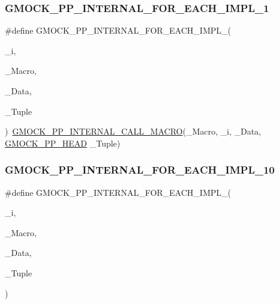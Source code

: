 \subsubsection{\texorpdfstring{GMOCK\_PP\_INTERNAL\_FOR\_EACH\_IMPL\_1}{GMOCK\_PP\_INTERNAL\_FOR\_EACH\_IMPL\_1}}
{\footnotesize\ttfamily \#define G\+M\+O\+C\+K\+\_\+\+P\+P\+\_\+\+I\+N\+T\+E\+R\+N\+A\+L\+\_\+\+F\+O\+R\+\_\+\+E\+A\+C\+H\+\_\+\+I\+M\+P\+L\+\_(\begin{DoxyParamCaption}\item[{}]{\+\_\+i,  }\item[{}]{\+\_\+\+Macro,  }\item[{}]{\+\_\+\+Data,  }\item[{}]{\+\_\+\+Tuple }\end{DoxyParamCaption})~\mbox{\hyperlink{_obj__test_2lib_2googletest-master_2googlemock_2include_2gmock_2internal_2gmock-pp_8h_a3fe0cf255d103cc945cd91e0e953846f}{G\+M\+O\+C\+K\+\_\+\+P\+P\+\_\+\+I\+N\+T\+E\+R\+N\+A\+L\+\_\+\+C\+A\+L\+L\+\_\+\+M\+A\+C\+RO}}(\+\_\+\+Macro, \+\_\+i, \+\_\+\+Data, \mbox{\hyperlink{_obj__test_2lib_2googletest-master_2googlemock_2include_2gmock_2internal_2gmock-pp_8h_ad7910160dfc0fb20b239efcf1f3ddd85}{G\+M\+O\+C\+K\+\_\+\+P\+P\+\_\+\+H\+E\+AD}} \+\_\+\+Tuple)}

\mbox{\label{_obj__test_2lib_2googletest-master_2googlemock_2include_2gmock_2internal_2gmock-pp_8h_ae6a832612f7db9940c60e2551343f697}} 
\subsubsection{\texorpdfstring{GMOCK\_PP\_INTERNAL\_FOR\_EACH\_IMPL\_10}{GMOCK\_PP\_INTERNAL\_FOR\_EACH\_IMPL\_10}}
{\footnotesize\ttfamily \#define G\+M\+O\+C\+K\+\_\+\+P\+P\+\_\+\+I\+N\+T\+E\+R\+N\+A\+L\+\_\+\+F\+O\+R\+\_\+\+E\+A\+C\+H\+\_\+\+I\+M\+P\+L\+\_(\begin{DoxyParamCaption}\item[{}]{\+\_\+i,  }\item[{}]{\+\_\+\+Macro,  }\item[{}]{\+\_\+\+Data,  }\item[{}]{\+\_\+\+Tuple }\end{DoxyParamCaption})}

